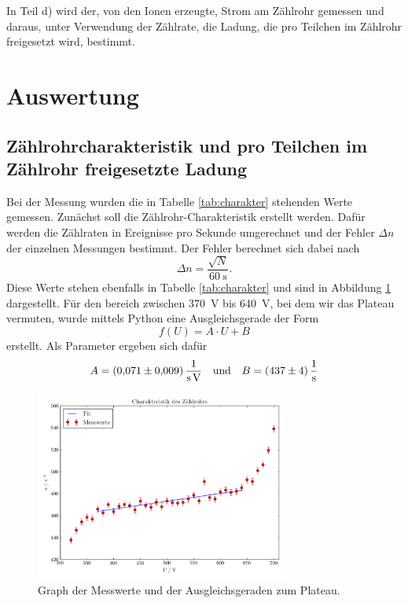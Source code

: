 \documentclass[
  bibliography=totoc,     %
  captions=tableheading,  %
  titlepage=firstiscover, %
]{scrartcl}
\begin{document}
\noindent
In Teil d) wird der, von den Ionen erzeugte, Strom am Zählrohr gemessen und daraus,
unter Verwendung der Zählrate, die Ladung, die pro Teilchen im Zählrohr freigesetzt
wird, bestimmt.
\section{Auswertung}
\label{sec:auswertung}
\subsection{Zählrohrcharakteristik und pro Teilchen im Zählrohr freigesetzte Ladung}
Bei der Messung wurden die in Tabelle \ref{tab:charakter} stehenden Werte gemessen.
Zunächst soll die Zählrohr-Charakteristik erstellt werden.
Dafür werden die Zählraten in Ereignisse pro Sekunde umgerechnet und
der Fehler $\Delta n$ der einzelnen Messungen bestimmt.
Der Fehler berechnet sich dabei nach
\begin{equation}
  \Delta n = \frac{\sqrt{N}}{\SI{60}{\second}}.
\end{equation}
Diese Werte stehen ebenfalls in Tabelle \ref{tab:charakter} und sind in Abbildung \ref{fig:plot1} dargestellt.
Für den bereich zwischen \SI{370}{\volt} bis \SI{640}{\volt}, bei dem wir das
Plateau vermuten, wurde mittels Python eine Ausgleichsgerade der Form
\begin{equation}
  f(U) = A \cdot U + B
\end{equation}
erstellt.
Als Parameter ergeben sich dafür
\begin{align}
  A &= \SI{0.071\pm0.009}{\per\second\per\volt} & &\text{und} &B = \SI{437\pm4}{\per\second}
\end{align}
\begin{figure}
  \centering
  \includegraphics[width=0.74\textwidth]{Plot.pdf}
  \caption{Graph der Messwerte und der Ausgleichsgeraden zum Plateau.}
  \label{fig:plot1}
\end{figure}
\end{document}
